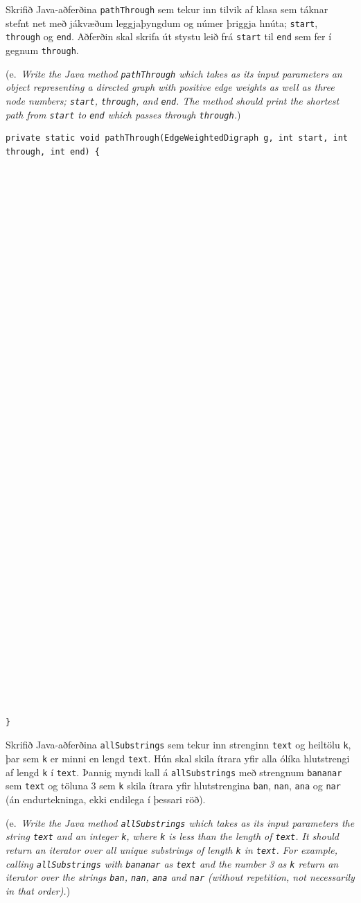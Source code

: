 \documentclass[addpoints]{exam}
\newcommand{\eng}[1]{(e.\ \emph{#1})}
\begin{document}
\begin{questions}
\begin{verbatim}
\end{verbatim}


	\newpage
	\question[4] Skrifið Java-aðferðina \texttt{pathThrough} sem tekur inn tilvik af klasa sem táknar stefnt net með jákvæðum leggjaþyngdum og númer þriggja hnúta; \texttt{start}, \texttt{through} og \texttt{end}. Aðferðin skal skrifa út stystu leið frá \texttt{start} til \texttt{end} sem fer í gegnum \texttt{through}.

	\eng{Write the Java method \texttt{pathThrough} which takes as its input parameters an object representing a directed graph with positive edge weights as well as three node numbers; \texttt{start}, \texttt{through}, and \texttt{end}. The method should print the shortest path from \texttt{start} to \texttt{end} which passes through \texttt{through}.}

	\begin{verbatim}
private static void pathThrough(EdgeWeightedDigraph g, int start, int through, int end) {









































}
\end{verbatim}

	\newpage
	\question[4] Skrifið Java-aðferðina \texttt{allSubstrings} sem tekur inn strenginn \texttt{text} og heiltölu \texttt{k}, þar sem \texttt{k} er minni en lengd \texttt{text}.
	Hún skal skila ítrara yfir alla ólíka hlutstrengi af lengd \texttt{k} í \texttt{text}. Þannig myndi kall á \texttt{allSubstrings} með strengnum \texttt{bananar} sem \texttt{text} og töluna 3 sem \texttt{k} skila ítrara yfir hlutstrengina \texttt{ban},  \texttt{nan}, \texttt{ana} og \texttt{nar} (án endurtekninga, ekki endilega í þessari röð).

	\eng{Write the Java method \texttt{allSubstrings} which takes as its input parameters the string \texttt{text} and an integer \texttt{k}, where \texttt{k} is less than the length of \texttt{text}.
		It should return an iterator over all unique substrings of length \texttt{k} in \texttt{text}. For example, calling \texttt{allSubstrings} with \texttt{bananar} as \texttt{text} and the number 3 as \texttt{k} return an iterator over the strings \texttt{ban},  \texttt{nan}, \texttt{ana} and \texttt{nar} (without repetition, not necessarily in that order).}


\end{questions}
\end{document}
